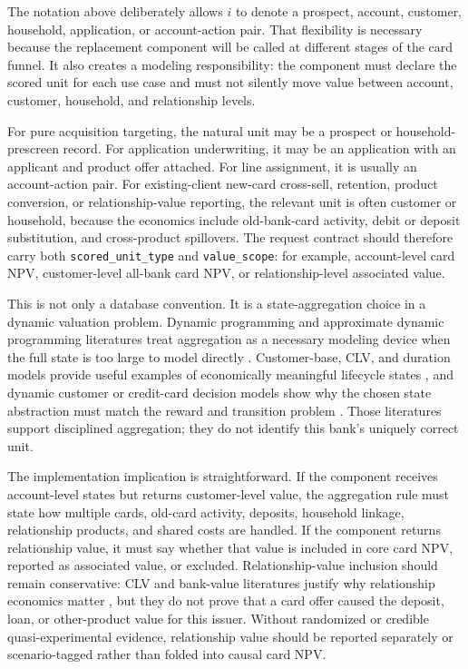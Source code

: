 \documentclass[11pt]{article}
\newcommand{\1}{\mathbf{1}}
\newcommand{\code}[1]{\nolinkurl{#1}}
\begin{document}
The notation above deliberately allows $i$ to denote a prospect, account,
customer, household, application, or account-action pair. That flexibility is
necessary because the replacement component will be called at different stages
of the card funnel. It also creates a modeling responsibility: the component
must declare the scored unit for each use case and must not silently move value
between account, customer, household, and relationship levels.

For pure acquisition targeting, the natural unit may be a prospect or
household-prescreen record. For application underwriting, it may be an
application with an applicant and product offer attached. For line assignment,
it is usually an account-action pair. For existing-client new-card cross-sell,
retention, product conversion, or relationship-value reporting, the relevant
unit is often customer or household, because the economics include old-bank-card
activity, debit or deposit substitution, and cross-product spillovers. The
request contract should therefore carry both \code{scored_unit_type} and
\code{value_scope}: for example, account-level card NPV, customer-level all-bank
card NPV, or relationship-level associated value.

This is not only a database convention. It is a state-aggregation choice in a
dynamic valuation problem. Dynamic programming and approximate dynamic
programming literatures treat aggregation as a necessary modeling device when
the full state is too large to model directly \citep{bean1987aggregation,
puterman1994mdp}. Customer-base, CLV, and duration models provide useful
examples of economically meaningful lifecycle states
\citep{schmittlein1987counting,fader2005bgnbd,bolton1998duration}, and dynamic
customer or credit-card decision models show why the chosen state abstraction
must match the reward and transition problem \citep{lewis2005relationshippricing,
thomas2011creditcardmdp}. Those literatures support disciplined aggregation;
they do not identify this bank's uniquely correct unit.

The implementation implication is straightforward. If the component receives
account-level states but returns customer-level value, the aggregation rule must
state how multiple cards, old-card activity, deposits, household linkage,
relationship products, and shared costs are handled. If the component returns
relationship value, it must say whether that value is included in core card NPV,
reported as associated value, or excluded. Relationship-value inclusion should
remain conservative: CLV and bank-value literatures justify why relationship
economics matter \citep{berger1998clv,rust2004return,venkatesan2004clv,
egan2022bankvalue}, but they do not prove that a card offer caused the deposit,
loan, or other-product value for this issuer. Without randomized or credible
quasi-experimental evidence, relationship value should be reported separately
or scenario-tagged rather than folded into causal card NPV.
\end{document}
